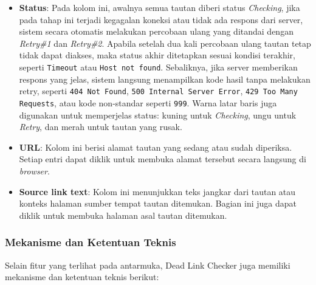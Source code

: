 \begin{enumerate}
\begin{itemize}
        \item \textbf{Status}: Pada kolom ini, awalnya semua tautan diberi status \textit{Checking}, jika pada tahap ini terjadi kegagalan koneksi atau tidak ada respons dari server, sistem secara otomatis melakukan percobaan ulang yang ditandai dengan \textit{Retry\#1} dan \textit{Retry\#2}. Apabila setelah dua kali percobaan ulang tautan tetap tidak dapat diakses, maka status akhir ditetapkan sesuai kondisi terakhir, seperti \texttt{Timeout} atau \texttt{Host not found}. Sebaliknya, jika server memberikan respons yang jelas, sistem langsung menampilkan kode hasil tanpa melakukan retry, seperti \texttt{404 Not Found}, \texttt{500 Internal Server Error}, \texttt{429 Too Many Requests}, atau kode non-standar seperti \texttt{999}. Warna latar baris juga digunakan untuk memperjelas status: kuning untuk \textit{Checking}, ungu untuk \textit{Retry}, dan merah untuk tautan yang rusak.
        
        \item \textbf{URL}: Kolom ini berisi alamat tautan yang sedang atau sudah diperiksa. Setiap entri dapat diklik untuk membuka alamat tersebut secara langsung di \textit{browser}.
        
        \item \textbf{Source link text}: Kolom ini menunjukkan teks jangkar dari tautan atau konteks halaman sumber tempat tautan ditemukan. Bagian ini juga dapat diklik untuk membuka halaman asal tautan ditemukan.
        
    \end{itemize}
\end{enumerate}

\subsubsection*{Mekanisme dan Ketentuan Teknis}  
Selain fitur yang terlihat pada antarmuka, Dead Link Checker juga memiliki mekanisme dan ketentuan teknis berikut:

